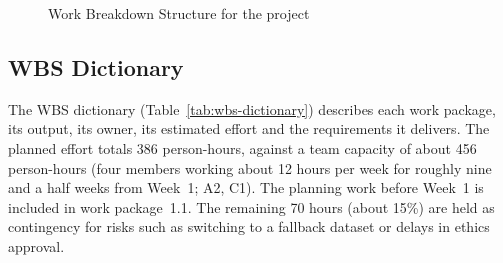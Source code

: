 \begin{landscape}
\begin{figure}[p]
\centering
\resizebox{\linewidth}{!}{}
\caption{Work Breakdown Structure for the \projectname{} project}
\label{fig:wbs}
\end{figure}
\end{landscape}

\subsection{WBS Dictionary}\label{sec:wbs-dictionary}

The WBS dictionary (Table~\ref{tab:wbs-dictionary}) describes each work package, its output, its owner, its estimated effort and the requirements it delivers. The planned effort totals 386 person-hours, against a team capacity of about 456 person-hours (four members working about 12 hours per week for roughly nine and a half weeks from Week~1; A2, C1). The planning work before Week~1 is included in work package~1.1. The remaining 70 hours (about 15\%) are held as contingency for risks such as switching to a fallback dataset or delays in ethics approval.

